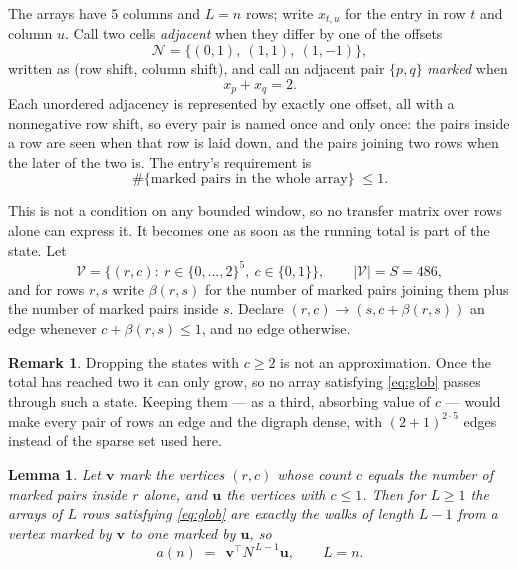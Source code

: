 \documentclass[11pt,a4paper]{article}
\theoremstyle{plain}
\newtheorem{lemma}[theorem]{Lemma}
\theoremstyle{definition}
\newtheorem{remark}[theorem]{Remark}
\begin{document}
The arrays have $5$ columns and $L=n$ rows; write $x_{t,u}$ for the entry in
row $t$ and column $u$. Call two cells \emph{adjacent} when they differ by one of the
offsets
\[
\mathcal N=\{(0,1),\ (1,1),\ (1,-1)\},
\]
written as (row shift, column shift), and call an adjacent pair $\{p,q\}$
\emph{marked} when
\[
x_{p}+x_{q}=2 .
\]
Each unordered adjacency is represented by exactly one offset, all with a nonnegative row
shift, so every pair is named once and only once: the pairs inside a row are seen when
that row is laid down, and the pairs joining two rows when the later of the two is. The
entry's requirement is
\begin{equation}\label{eq:glob}
\#\{\text{marked pairs in the whole array}\}\;\le1.
\end{equation}

This is not a condition on any bounded window, so no transfer matrix over rows alone can
express it. It becomes one as soon as the running total is part of the state. Let
\[
\mathcal V=\bigl\{(r,c):\ r\in\{0,\dots,2\}^{5},\ c\in\{0,1\}\bigr\},
\qquad |\mathcal V|=S=486,
\]
and for rows $r,s$ write $\beta(r,s)$ for the number of marked pairs joining them plus the
number of marked pairs inside $s$. Declare $(r,c)\to(s,c+\beta(r,s))$ an edge whenever
$c+\beta(r,s)\le1$, and no edge otherwise.

\begin{remark}
Dropping the states with $c\ge2$ is not an approximation. Once the total has reached two it
can only grow, so no array satisfying \eqref{eq:glob} passes through such a state. Keeping
them --- as a third, absorbing value of $c$ --- would make every pair of rows an edge and
the digraph dense, with $(2+1)^{2\cdot5}$ edges instead of the sparse set used here.
\end{remark}

\begin{lemma}\label{lem:walk}
Let $\mathbf{v}$ mark the vertices $(r,c)$ whose count $c$ equals the number of marked pairs
inside $r$ alone, and $\mathbf{u}$ the vertices with $c\le1$. Then for $L\ge1$ the arrays
of $L$ rows satisfying \eqref{eq:glob} are exactly the walks of length $L-1$ from a
vertex marked by $\mathbf{v}$ to one marked by $\mathbf{u}$, so
\[
a(n)\;=\;\,\mathbf{v}^{\!\top}N^{\,L-1}\mathbf{u},\qquad L=n .
\]
\end{lemma}
\end{document}
